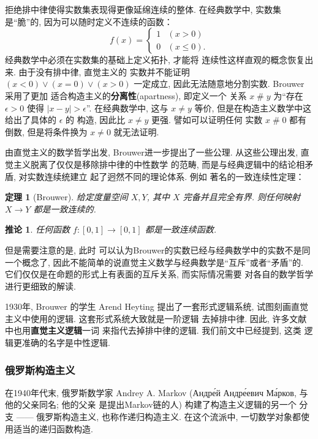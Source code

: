 \documentclass[UTF8]{ctexbook}
\theoremstyle{plain}
\newtheorem{theorem}{定理}[chapter]
\newtheorem{corollary}{推论}[chapter]
\theoremstyle{definition}
\theoremstyle{remark}
\begin{document}
拒绝排中律使得实数集表现得更像延绵连续的整体. 在经典数学中,
实数集是“脆”的, 因为可以随时定义不连续的函数：
\[f(x) = \begin{cases}
1 & (x > 0)\\
0 & (x \le 0).
\end{cases}\]
经典数学中必须在实数集的基础上定义拓扑, 才能将
连续性这样直观的概念恢复出来. 由于没有排中律, 直觉主义的
实数并不能证明 \((x < 0) \vee (x = 0) \vee (x > 0)\)
一定成立, 因此无法随意地分割实数. Brouwer 采用了更加
适合构造主义的\textbf{分离性}(apartness), 即定义一个
关系 \(x \mathop{\#} y\) 为“存在 \(\epsilon > 0\)
使得 \(|x - y| > \epsilon\)”. 在经典数学中, 这与
\(x \ne y\) 等价, 但是在构造主义数学中这给出了具体的 \(\epsilon\) 的
构造, 因此比 \(x \ne y\) 更强. 譬如可以证明任何
实数 \(x \mathop{\#} 0\) 都有倒数, 但是将条件换为
\(x \ne 0\) 就无法证明.

由直觉主义的数学哲学出发, Brouwer进一步提出了一些公理.
从这些公理出发, 直觉主义脱离了仅仅是移除排中律的中性数学
的范畴, 而是与经典逻辑中的结论相矛盾, 对实数连续统建立
起了迥然不同的理论体系. 例如
著名的一致连续性定理：
\begin{theorem}[Brouwer]
给定度量空间 \(X,Y\), 其中 \(X\) 完备并且完全有界.
则任何映射 \(X\to Y\) 都是一致连续的.
\end{theorem}
\begin{corollary}\label{ch:brouwer:funny}
任何函数 \(f : [0,1] \to [0,1]\) 都是一致连续函数.
\end{corollary}
但是需要注意的是, 此时
可以认为Brouwer的实数已经与经典数学中的实数不是同一个概念了,
因此不能简单的说直觉主义数学与经典数学是“互斥”或者“矛盾”的.
它们仅仅是在命题的形式上有表面的互斥关系, 而实际情况需要
对各自的数学哲学进行更细致的解读.

1930年, Brouwer 的学生 Arend Heyting 提出了一套形式逻辑系统,
试图刻画直觉主义中使用的逻辑. 这套形式系统大致就是一阶逻辑
去掉排中律. 因此, 许多文献中也用\textbf{直觉主义逻辑}一词
来指代去掉排中律的逻辑. 我们前文中已经提到, 这类
逻辑更准确的名字是中性逻辑.

\subsubsection{俄罗斯构造主义}

在1940年代末, 俄罗斯数学家 Andrey A. Markov
({\tempfont Андре́й Андре́евич Ма́рков}, 与他的父亲同名; 他的父亲
是提出Markov链的人) 构建了构造主义逻辑的另一个
分支 ------ 俄罗斯构造主义, 也称作递归构造主义.
在这个流派中, 一切数学对象都使用适当的递归函数构造.
\end{document}
